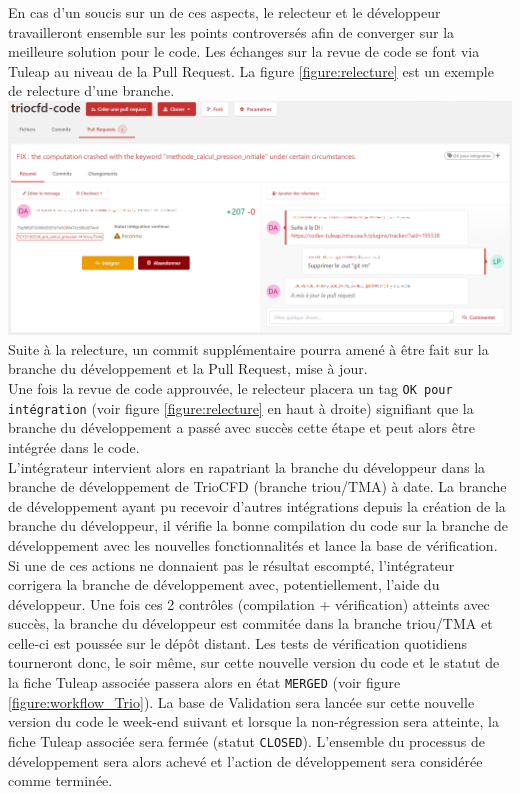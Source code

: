 En cas d'un soucis sur un de ces aspects, le relecteur et le développeur travailleront ensemble sur les points controversés afin de converger sur la meilleure solution pour le code.	Les échanges sur la revue de code se font via Tuleap au niveau de la Pull Request. La figure \ref{figure:relecture} est un exemple de relecture d'une branche.
   \includegraphics[width=16cm]{pictures/echangesRelecture.png}\vspace*{0.1cm}
\vspace*{0.7cm}   
Suite à la relecture, un commit supplémentaire pourra amené à être fait sur la branche du développement et la Pull Request, mise à jour.\\
Une 	fois la revue de code approuvée, le relecteur placera un tag \texttt{OK pour intégration} (voir figure \ref{figure:relecture} en haut à droite) signifiant que la branche du développement a passé avec succès cette étape et peut alors être intégrée dans le code.\\
L'intégrateur intervient alors en rapatriant 	la branche du développeur dans la branche de développement de TrioCFD (branche triou/TMA) à date. La branche de développement ayant pu recevoir d'autres intégrations depuis la création de la branche du développeur, il vérifie la bonne compilation du code sur la branche de développement avec les nouvelles fonctionnalités et lance la base de vérification. Si une de ces actions ne donnaient pas le résultat escompté, l'intégrateur corrigera la branche de développement avec, potentiellement, l'aide du développeur. Une fois ces 2  contrôles (compilation + vérification) atteints avec succès, la branche du développeur est commitée dans la branche triou/TMA et celle-ci est poussée sur le dépôt distant. Les tests de vérification quotidiens tourneront donc, le soir même, sur cette nouvelle version du code et le statut de la fiche Tuleap associée passera alors en état \texttt{MERGED} (voir figure \ref{figure:workflow_Trio}). La base de Validation sera lancée sur cette nouvelle version du code le week-end suivant et lorsque la non-régression sera atteinte, la fiche Tuleap associée sera fermée (statut \texttt{CLOSED}). L'ensemble du processus de développement sera alors achevé et l'action de développement sera considérée comme terminée.


